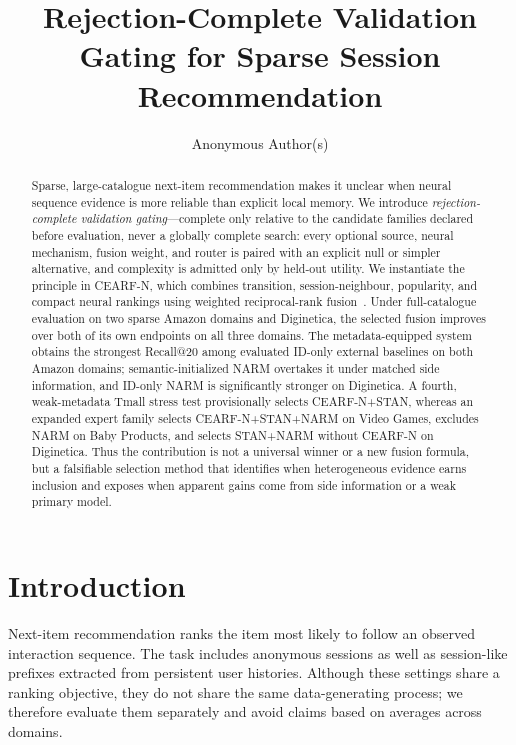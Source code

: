 \documentclass[runningheads]{llncs}
\newcommand{\method}{CEARF-N}
\begin{document}
\title{Rejection-Complete Validation Gating for Sparse Session Recommendation}
\author{Anonymous Author(s)}
\maketitle

\begin{abstract}
Sparse, large-catalogue next-item recommendation makes it unclear when neural
sequence evidence is more reliable than explicit local memory. We introduce
\emph{rejection-complete validation gating}---complete only relative to the
candidate families declared before evaluation, never a globally complete
search: every optional source, neural
mechanism, fusion weight, and router is paired with an explicit null or simpler
alternative, and complexity is admitted only by held-out utility. We instantiate
the principle in \method{}, which combines transition, session-neighbour,
popularity, and compact neural rankings using weighted reciprocal-rank
fusion~\cite{cormack2009rrf}. Under full-catalogue evaluation on two sparse
Amazon domains and Diginetica, the selected fusion improves over both of its
own endpoints on all three domains. The metadata-equipped system obtains the
strongest Recall@20 among evaluated ID-only external baselines on both Amazon
domains; semantic-initialized NARM overtakes it under matched side information,
and ID-only NARM is significantly stronger on Diginetica. A fourth,
weak-metadata Tmall stress test provisionally selects CEARF-N+STAN, whereas
an expanded expert family selects CEARF-N+STAN+NARM on Video Games, excludes
NARM on Baby Products, and selects STAN+NARM without CEARF-N on Diginetica.
Thus the contribution is not a universal winner or a new fusion formula, but a
falsifiable selection method that identifies when heterogeneous evidence earns
inclusion and exposes when apparent gains come from side information or a weak
primary model.
\end{abstract}

\section{Introduction}
Next-item recommendation ranks the item most likely to follow an observed
interaction sequence. The task includes anonymous sessions as well as
session-like prefixes extracted from persistent user histories. Although these
settings share a ranking objective, they do not share the same data-generating
process; we therefore evaluate them separately and avoid claims based on
averages across domains.
\end{document}
